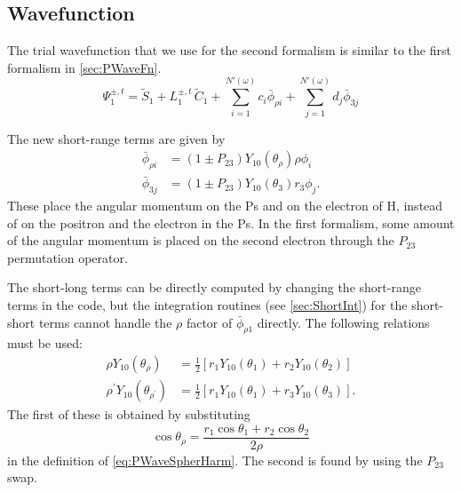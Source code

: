 \documentclass[Dissertation.tex]{subfiles}
\begin{document}
\subsection{Wavefunction}
The trial wavefunction that we use for the second formalism is similar to the first formalism in \cref{sec:PWaveFn}.
\begin{equation}
\Psi_1^{\pm,t} = \widetilde{S}_1 + L_1^{\pm,t} \, \widetilde{C}_1 + \sum_{i=1}^{N'(\omega)} c_i \bar{\phi}_{\rho i} + \sum_{j=1}^{N'(\omega)} d_j \bar{\phi}_{3j}
\label{eq:PWave2ndWavefn}
\end{equation}

\noindent The new short-range terms are given by
\begin{subequations}
\label{eq:PWave2ndPhiBar}
\begin{align}
\bar{\phi}_{\rho i} &= \left(1 \pm P_{23}\right) Y_{10}(\theta_\rho) \rho \phi_i \label{eq:PWave2ndPhi1i}\\
\bar{\phi}_{3j} &= \left(1 \pm P_{23}\right) Y_{10}(\theta_3) r_3 \phi_j \label{eq:PWave2ndPhi2j}.
\end{align}
\end{subequations}
These place the angular momentum on the Ps and on the electron of H, instead of on the positron and the electron in the Ps. In the first formalism, some amount of the angular momentum is placed on the second electron through the $P_{23}$ permutation operator.

The short-long terms can be directly computed by changing the short-range terms in the code, but the integration routines (see \cref{sec:ShortInt}) for the short-short terms cannot handle the $\rho$ factor of $\bar{\phi}_{\rho 1}$ directly. The following relations must be used:
\begin{subequations}
\label{eq:P2rhoY10}
\begin{align}
\rho Y_{10}(\theta_\rho) &= \frac{1}{2}\left[ r_1 Y_{10}(\theta_1) + r_2 Y_{10}(\theta_2) \right] \\
\rho^\prime Y_{10}(\theta_{\rho^\prime}) &= \frac{1}{2}\left[ r_1 Y_{10}(\theta_1) + r_3 Y_{10}(\theta_3) \right].
\end{align}
\end{subequations}
The first of these is obtained by substituting
\begin{equation}
\label{eq:CosRho}
\cos\theta_\rho = \frac{r_1 \cos\theta_1 + r_2 \cos\theta_2}{2\rho}
\end{equation}
in the definition of \cref{eq:PWaveSpherHarm}. The second is found by using the $P_{23}$ swap.
\end{document}
